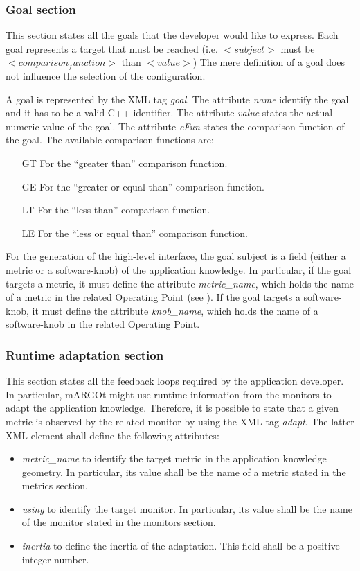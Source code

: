 \subsubsection*{Goal section}
\label{ssec:goal}

This section states all the goals that the developer would like to express.
Each goal represents a target that must be reached (i.e. \textit{$<subject>$} must be \textit{$<comparison_function>$} than \textit{$<value>$})
The mere definition of a goal does not influence the selection of the configuration.

A goal is represented by the XML tag \textit{goal}.
The attribute \textit{name} identify the goal and it has to be a valid C++ identifier.
The attribute \textit{value} states the actual numeric value of the goal.
The attribute \textit{cFun} states the comparison function of the goal.
The available comparison functions are:
\begin{enumerate}
	\item[GT] For the ``greater than'' comparison function.
	\item[GE] For the ``greater or equal than'' comparison function.
	\item[LT] For the ``less than'' comparison function.
	\item[LE] For the ``less or equal than'' comparison function. 
\end{enumerate}

For the generation of the high-level interface, the goal subject is a field (either a metric or a software-knob) of the application knowledge.
In particular, if the goal targets a metric, it must define the attribute \textit{metric\_name}, which holds the name of a metric in the related Operating Point (see ).
If the goal targets a software-knob, it must define the attribute \textit{knob\_name}, which holds the name of a software-knob in the related Operating Point.


\subsubsection*{Runtime adaptation section}

This section states all the feedback loops required by the application developer.
In particular, mARGOt might use runtime information from the monitors to adapt the application knowledge.
Therefore, it is possible to state that a given metric is observed by the related monitor by using the XML tag \textit{adapt}.
The latter XML element shall define the following attributes:
\begin{itemize}
	\item \textit{metric\_name} to identify the target metric in the application knowledge geometry. In particular, its value shall be the name of a metric stated in the metrics section.
	\item \textit{using} to identify the target monitor. In particular, its value shall be the name of the monitor stated in the monitors section.
	\item \textit{inertia} to define the inertia of the adaptation. This field shall be a positive integer number.
\end{itemize} 




